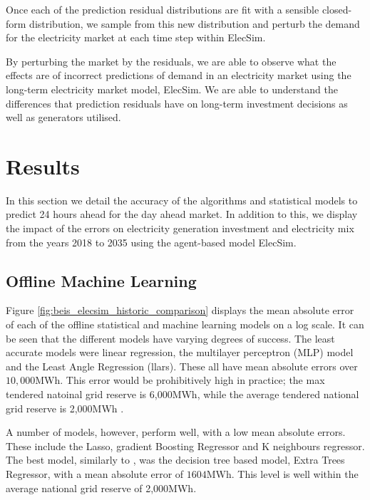 \documentclass[final,3p,times,twocolumn,numbers]{elsarticle}
\begin{document}
Once each of the prediction residual distributions are fit with a sensible closed-form distribution, we sample from this new distribution and perturb the demand for the electricity market at each time step within ElecSim.

By perturbing the market by the residuals, we are able to observe what the effects are of incorrect predictions of demand in an electricity market using the long-term electricity market model, ElecSim. We are able to understand the differences that prediction residuals have on long-term investment decisions as well as generators utilised.




\section{Results}
\label{sec:results}

In this section we detail the accuracy of the algorithms and statistical models to predict 24 hours ahead for the day ahead market. In addition to this, we display the impact of the errors on electricity generation investment and electricity mix from the years 2018 to 2035 using the agent-based model ElecSim.

\subsection{Offline Machine Learning}

Figure \ref{fig:beis_elecsim_historic_comparison} displays the mean absolute error of each of the offline statistical and machine learning models on a log scale. It can be seen that the different models have varying degrees of success. The least accurate models were linear regression, the multilayer perceptron (MLP) model and the Least Angle Regression (llars). These all have mean absolute errors over $10,000$MWh. This error would be prohibitively high in practice; the max tendered natoinal grid reserve is 6,000MWh, while the average tendered national grid reserve is 2,000MWh \cite{ESO2019}.

A number of models, however, perform well, with a low mean absolute errors. These include the Lasso, gradient Boosting Regressor and K neighbours regressor. The best model, similarly to \cite{Kell2018a}, was the decision tree based model, Extra Trees Regressor, with a mean absolute error of $1604$MWh. This level is well within the average national grid reserve of 2,000MWh.
\end{document}
